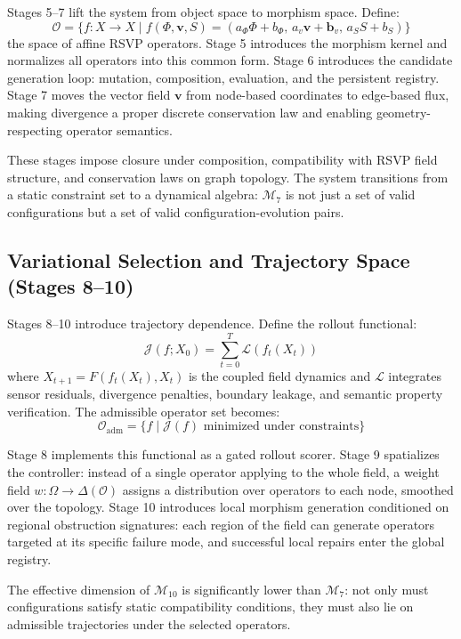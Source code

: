 \documentclass[12pt, oneside]{article}
\begin{document}
Stages 5--7 lift the system from object space to morphism space. Define:
\[
\mathcal{O} = \{ f : X \to X \mid f(\Phi, \mathbf{v}, S) = (a_\Phi\Phi + b_\Phi,\, a_v\mathbf{v} + \mathbf{b}_v,\, a_S S + b_S) \}
\]
the space of affine RSVP operators. Stage 5 introduces the morphism kernel and
normalizes all operators into this common form. Stage 6 introduces the candidate
generation loop: mutation, composition, evaluation, and the persistent registry.
Stage 7 moves the vector field $\mathbf{v}$ from node-based coordinates to edge-based
flux, making divergence a proper discrete conservation law and enabling
geometry-respecting operator semantics.

These stages impose closure under composition, compatibility with RSVP field structure,
and conservation laws on graph topology. The system transitions from a static constraint
set to a dynamical algebra: $\mathcal{M}_7$ is not just a set of valid configurations
but a set of valid configuration-evolution pairs.

\subsection{Variational Selection and Trajectory Space (Stages 8--10)}

Stages 8--10 introduce trajectory dependence. Define the rollout functional:
\[
\mathcal{J}(f; X_0) = \sum_{t=0}^T \mathcal{L}(f_t(X_t))
\]
where $X_{t+1} = F(f_t(X_t), X_t)$ is the coupled field dynamics and $\mathcal{L}$
integrates sensor residuals, divergence penalties, boundary leakage, and semantic
property verification. The admissible operator set becomes:
\[
\mathcal{O}_{\mathrm{adm}} = \{ f \mid \mathcal{J}(f) \text{ minimized under constraints} \}
\]

Stage 8 implements this functional as a gated rollout scorer. Stage 9 spatializes the
controller: instead of a single operator applying to the whole field, a weight field
$w : \Omega \to \Delta(\mathcal{O})$ assigns a distribution over operators to each node,
smoothed over the topology. Stage 10 introduces local morphism generation conditioned on
regional obstruction signatures: each region of the field can generate operators targeted
at its specific failure mode, and successful local repairs enter the global registry.

The effective dimension of $\mathcal{M}_{10}$ is significantly lower than
$\mathcal{M}_7$: not only must configurations satisfy static compatibility conditions,
they must also lie on admissible trajectories under the selected operators.
\end{document}
